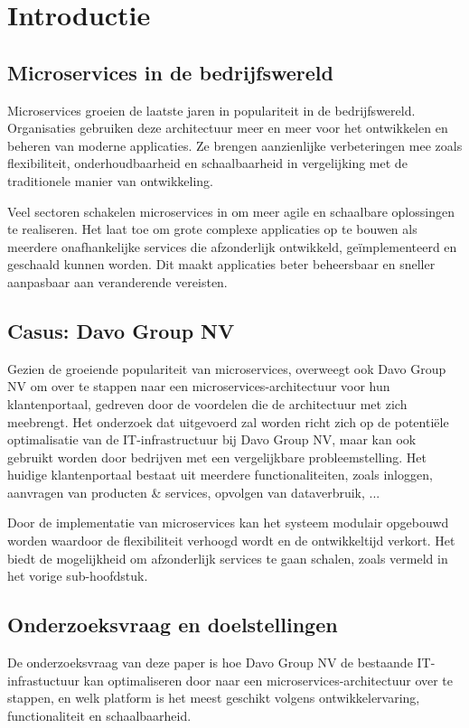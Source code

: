 
\section{Introductie}%
\label{sec:introductie}
\subsection{Microservices in de bedrijfswereld}
Microservices groeien de laatste jaren in populariteit in de bedrijfswereld. Organisaties gebruiken deze architectuur meer en meer voor het ontwikkelen en beheren van moderne applicaties. Ze brengen aanzienlijke verbeteringen mee zoals flexibiliteit, onderhoudbaarheid en schaalbaarheid in vergelijking met de traditionele manier van ontwikkeling.

Veel sectoren schakelen microservices in om meer agile en schaalbare oplossingen te realiseren. Het laat toe om grote complexe applicaties op te bouwen als meerdere onafhankelijke services die afzonderlijk ontwikkeld, geïmplementeerd en geschaald kunnen worden. Dit maakt applicaties beter beheersbaar en sneller aanpasbaar aan veranderende vereisten.

\subsection{Casus: Davo Group NV}
Gezien de groeiende populariteit van microservices, overweegt ook Davo Group NV om over te stappen naar een microservices-architectuur voor hun klantenportaal, gedreven door de voordelen die de architectuur met zich meebrengt. Het onderzoek dat uitgevoerd zal worden richt zich op de potentiële optimalisatie van de IT-\newline infrastructuur bij Davo Group NV, maar kan ook gebruikt worden door bedrijven met een vergelijkbare probleemstelling. Het huidige klantenportaal bestaat uit meerdere functionaliteiten, zoals inloggen, aanvragen van producten \& services, opvolgen van dataverbruik, ...

Door de implementatie van microservices kan het systeem modulair opgebouwd worden waardoor de flexibiliteit verhoogd wordt en de ontwikkeltijd verkort. Het biedt de mogelijkheid om afzonderlijk services te gaan schalen, zoals vermeld in het vorige sub-hoofdstuk.

\subsection{Onderzoeksvraag en doelstellingen}
De onderzoeksvraag van deze paper is hoe Davo Group NV de bestaande IT-infrastuctuur kan optimaliseren door naar een microservices-\newline architectuur over te stappen, en welk platform is het meest geschikt volgens ontwikkelervaring, functionaliteit en schaalbaarheid.

